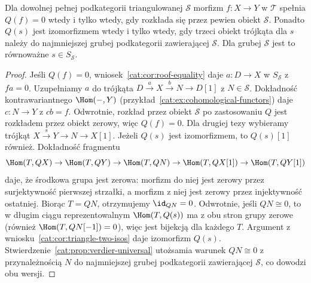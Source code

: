 \begin{wniosek}\label{cat:cor:verdier-zero-morphisms}
Dla dowolnej pełnej podkategorii triangulowanej $\mathcal S$ morfizm $f:X\to Y$ w $\mathcal T$ spełnia $Q(f)=0$ wtedy i tylko wtedy, gdy rozkłada się przez pewien obiekt $\mathcal S$. Ponadto $Q(s)$ jest izomorfizmem wtedy i tylko wtedy, gdy trzeci obiekt trójkąta dla $s$ należy do najmniejszej grubej podkategorii zawierającej $\mathcal S$. Dla grubej $\mathcal S$ jest to równoważne $s\in S_{\mathcal S}$.
\end{wniosek}
\begin{proof}
Jeśli $Q(f)=0$, wniosek~\ref{cat:cor:roof-equality} daje $a:D\to X$ w $S_{\mathcal S}$ z $fa=0$. Uzupełniamy $a$ do trójkąta $D\xrightarrow a X\xrightarrow b N\to D[1]$ z $N\in\mathcal S$. Dokładność kontrawariantnego $\Hom(-,Y)$ (przykład~\ref{cat:ex:cohomological-functors}) daje $c:N\to Y$ z $cb=f$. Odwrotnie, rozkład przez obiekt $\mathcal S$ po zastosowaniu $Q$ jest rozkładem przez obiekt zerowy, więc $Q(f)=0$. Dla drugiej tezy wybieramy trójkąt $X\xrightarrow{s}Y\to N\to X[1]$. Jeżeli $Q(s)$ jest izomorfizmem, to $Q(s)[1]$ również. Dokładność fragmentu
\[
 \Hom(T,QX)\to\Hom(T,QY)\to\Hom(T,QN)
 \to\Hom(T,QX[1])\to\Hom(T,QY[1])
\]
daje, że środkowa grupa jest zerowa: morfizm do niej jest zerowy przez surjektywność pierwszej strzałki, a morfizm z niej jest zerowy przez injektywność ostatniej. Biorąc $T=QN$, otrzymujemy $\id_{QN}=0$. Odwrotnie, jeśli $QN\cong0$, to w długim ciągu reprezentowalnym $\Hom(T,Q(s))$ ma z obu stron grupy zerowe (również $\Hom(T,QN[-1])=0$), więc jest bijekcją dla każdego $T$. Argument z wniosku~\ref{cat:cor:triangle-two-isos} daje izomorfizm $Q(s)$. Stwierdzenie~\ref{cat:prop:verdier-universal} utożsamia warunek $QN\cong0$ z przynależnością $N$ do najmniejszej grubej podkategorii zawierającej $\mathcal S$, co dowodzi obu wersji.
\end{proof}


